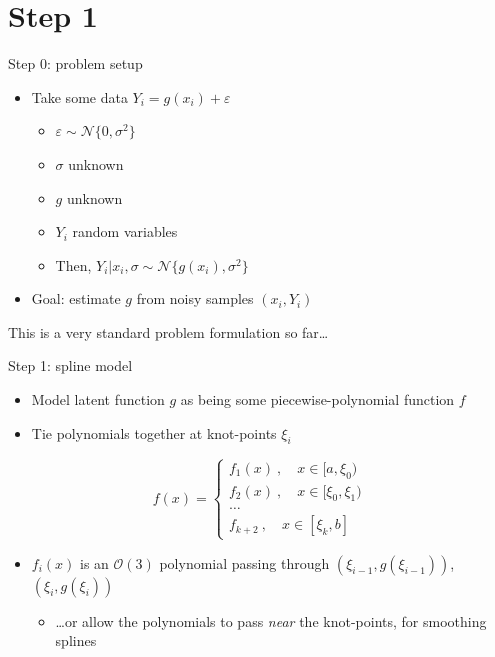 \documentclass[presentation]{beamer}
\begin{document}
\section{Step 1}
\label{sec:orge722b6b}
\begin{frame}[label={sec:orgb575baf}]{Step 0: problem setup}
\begin{itemize}
\item Take some data \(Y_i = g(x_i) + \varepsilon\)
\begin{itemize}
\item \(\varepsilon\sim\mathcal{N}\{0, \sigma^2\}\)
\item \(\sigma\) unknown
\item \(g\) unknown
\item \(Y_i\) random variables
\item Then, \(Y_i|x_i, \sigma\sim\mathcal{N}\{g(x_i), \sigma^2\}\)
\end{itemize}
\end{itemize}
\vfill
\begin{itemize}
\item Goal: estimate \(g\) from noisy samples \((x_i, Y_i)\)
\end{itemize}
\vfill
This is a very standard problem formulation so far\ldots{}
\end{frame}

\begin{frame}[label={sec:org868b9bf}]{Step 1: spline model}
\begin{itemize}
\item Model latent function \(g\) as being some piecewise-polynomial function \(f\)
\item Tie polynomials together at knot-points \(\xi_i\)
\end{itemize}

\begin{equation}
f(x) = 
    \begin{cases}
        f_1(x)~, \quad x\in[a,\xi_0)\\
	f_2(x)~, \quad x\in[\xi_0, \xi_1)\\
	\dots \\
	f_{k+2}~,\quad x\in[\xi_k, b]
    \end{cases}
\end{equation}

\begin{itemize}
\item \(f_i(x)\) is an \(\mathcal{O}(3)\) polynomial passing through \((\xi_{i-1},g(\xi_{i-1}))\), \((\xi_i, g(\xi_i))\)
\begin{itemize}
\item \ldots{}or allow the polynomials to pass \emph{near} the knot-points, for smoothing splines
\end{itemize}
\end{itemize}
\end{frame}
\end{document}
